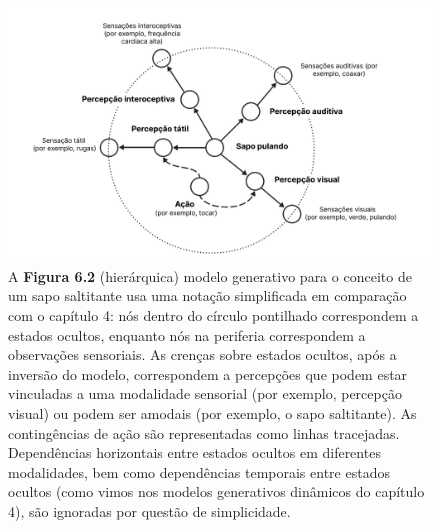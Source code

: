 \documentclass[
  12pt,
]{book}
\begin{document}
\begin{figure}
\centering
\includegraphics{images/Figura_6_2.png}
\caption{A \textbf{Figura 6.2} (hierárquica) modelo generativo para o conceito de um sapo saltitante usa uma notação simplificada em comparação com o capítulo 4: nós dentro do círculo pontilhado correspondem a estados ocultos, enquanto nós na periferia correspondem a observações sensoriais. As crenças sobre estados ocultos, após a inversão do modelo, correspondem a percepções que podem estar vinculadas a uma modalidade sensorial (por exemplo, percepção visual) ou podem ser amodais (por exemplo, o sapo saltitante). As contingências de ação são representadas como linhas tracejadas. Dependências horizontais entre estados ocultos em diferentes modalidades, bem como dependências temporais entre estados ocultos (como vimos nos modelos generativos dinâmicos do capítulo 4), são ignoradas por questão de simplicidade.}
\end{figure}
\end{document}
